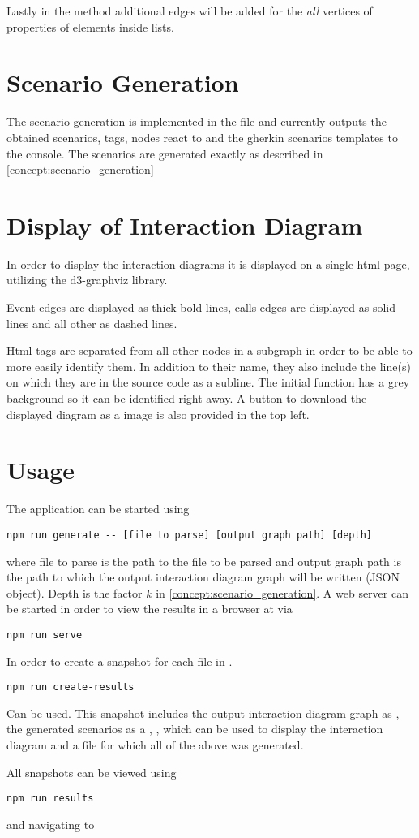 Lastly in the  method additional edges will be added for the \textit{all} vertices of properties of elements inside lists.

\section{Scenario Generation}
The scenario generation is implemented in the  file and currently outputs the obtained scenarios, tags, nodes react to and the gherkin scenarios templates to the console. The scenarios are generated exactly as described in \ref{concept:scenario_generation}

\section{Display of Interaction Diagram}
In order to display the interaction diagrams it is displayed on a single html page, utilizing the d3-graphviz \parencite{graph_viz} library. 

Event edges are displayed as thick bold lines, calls edges are displayed as solid lines and all other as dashed lines.

Html tags are separated from all other nodes in a subgraph in order to be able to more easily identify them. In addition to their name, they also include the line(s) on which they are in the source code as a subline. The initial function has a grey background so it can be identified right away.
A button to download the displayed diagram as a  image is also provided in the top left.

\section{Usage}
The application can be started using
\begin{lstlisting}[style=bash]
npm run generate -- [file to parse] [output graph path] [depth]
\end{lstlisting}
where file to parse is the path to the  file to be parsed and output graph path is the path to which the output interaction diagram graph will be written (JSON object). Depth is the factor $k$ in \ref{concept:scenario_generation}.
A web server can be started in order to view the results in a browser at  via
\begin{lstlisting}[style=bash]
npm run serve
\end{lstlisting}
In order to create a snapshot for each file in .
\begin{lstlisting}[style=bash]
npm run create-results  
\end{lstlisting}
Can be used. This snapshot includes the output interaction diagram graph as , the generated scenarios as a , , which can be used to display the interaction diagram and a  file for which all of the above was generated.

All snapshots can be viewed using
\begin{lstlisting}[style=bash]
npm run results 
\end{lstlisting}
and navigating to 

